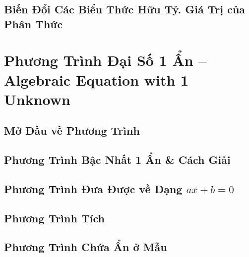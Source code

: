 \documentclass{article}
\numberwithin{equation}{section}
\begin{document}

\subsection{Biến Đổi Các Biểu Thức Hữu Tỷ. Giá Trị của Phân Thức}


\section{Phương Trình Đại Số 1 Ẩn -- Algebraic Equation with 1 Unknown}

\subsection{Mở Đầu về Phương Trình}


\subsection{Phương Trình Bậc Nhất 1 Ẩn \& Cách Giải}


\subsection{Phương Trình Đưa Được về Dạng $ax + b = 0$}


\subsection{Phương Trình Tích}


\subsection{Phương Trình Chứa Ẩn ở Mẫu}

\end{document}
